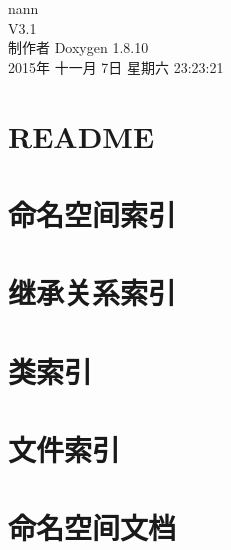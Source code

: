 \documentclass[twoside]{book}
\newcommand{\+}{\discretionary{\mbox{\scriptsize$\hookleftarrow$}}{}{}}
\newcommand{\clearemptydoublepage}{%
  \newpage{\pagestyle{empty}\cleardoublepage}%
}
\begin{document}
\hypersetup{pageanchor=false,
             bookmarks=true,
             bookmarksnumbered=true,
             pdfencoding=unicode
            }
\begin{titlepage}
\vspace*{7cm}
\begin{center}%
{\Large nann \\[1ex]\large V3.\+1 }\\
\vspace*{1cm}
{\large 制作者 Doxygen 1.8.10}\\
\vspace*{0.5cm}
{\small 2015年 十一月 7日 星期六 23:23:21}\\
\end{center}
\end{titlepage}
\clearemptydoublepage
\tableofcontents
\clearemptydoublepage
{}
\hypersetup{pageanchor=true}

\chapter{R\+E\+A\+D\+M\+E}
\label{md__r_e_a_d_m_e}
\hypertarget{md__r_e_a_d_m_e}{}

\chapter{命名空间索引}

\chapter{继承关系索引}

\chapter{类索引}

\chapter{文件索引}

\chapter{命名空间文档}



\end{document}
